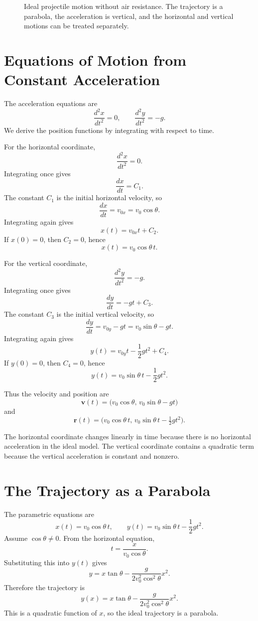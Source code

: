 \begin{figure}[h]
\centering

\caption{Ideal projectile motion without air resistance. The trajectory is a
parabola, the acceleration is vertical, and the horizontal and vertical motions
can be treated separately.}
\end{figure}

\section{Equations of Motion from Constant Acceleration}

The acceleration equations are
\[
\frac{d^2x}{dt^2}=0,
\qquad
\frac{d^2y}{dt^2}=-g.
\]
We derive the position functions by integrating with respect to time.

For the horizontal coordinate,
\[
\frac{d^2x}{dt^2}=0.
\]
Integrating once gives
\[
\frac{dx}{dt}=C_1.
\]
The constant \(C_1\) is the initial horizontal velocity, so
\[
\frac{dx}{dt}=v_{0x}=v_0\cos\theta.
\]
Integrating again gives
\[
x(t)=v_{0x}t+C_2.
\]
If \(x(0)=0\), then \(C_2=0\), hence
\[
\boxed{x(t)=v_0\cos\theta\, t.}
\]

For the vertical coordinate,
\[
\frac{d^2y}{dt^2}=-g.
\]
Integrating once gives
\[
\frac{dy}{dt}=-gt+C_3.
\]
The constant \(C_3\) is the initial vertical velocity, so
\[
\frac{dy}{dt}=v_{0y}-gt=v_0\sin\theta-gt.
\]
Integrating again gives
\[
y(t)=v_{0y}t-\frac{1}{2}gt^2+C_4.
\]
If \(y(0)=0\), then \(C_4=0\), hence
\[
\boxed{y(t)=v_0\sin\theta\, t-\frac{1}{2}gt^2.}
\]

Thus the velocity and position are
\[
\boxed{\mathbf{v}(t)=\bigl(v_0\cos\theta,\,v_0\sin\theta-gt\bigr)}
\]
and
\[
\boxed{\mathbf{r}(t)=\bigl(v_0\cos\theta\,t,\,v_0\sin\theta\,t-
\tfrac{1}{2}gt^2\bigr).}
\]

\begin{remarkbox}
The horizontal coordinate changes linearly in time because there is no
horizontal acceleration in the ideal model. The vertical coordinate contains a
quadratic term because the vertical acceleration is constant and nonzero.
\end{remarkbox}

\section{The Trajectory as a Parabola}

The parametric equations are
\[
x(t)=v_0\cos\theta\,t,
\qquad
y(t)=v_0\sin\theta\,t-\frac{1}{2}gt^2.
\]
Assume \(\cos\theta\neq 0\). From the horizontal equation,
\[
t=\frac{x}{v_0\cos\theta}.
\]
Substituting this into \(y(t)\) gives
\[
y=x\tan\theta-
\frac{g}{2v_0^2\cos^2\theta}x^2.
\]
Therefore the trajectory is
\[
\boxed{y(x)=x\tan\theta-
\frac{g}{2v_0^2\cos^2\theta}x^2.}
\]
This is a quadratic function of \(x\), so the ideal trajectory is a parabola.

